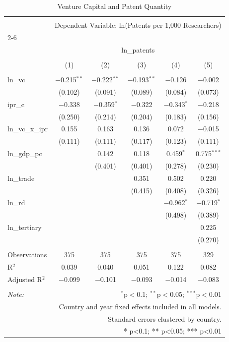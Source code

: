 
\begin{table}[!htbp] \centering 
  \caption{Venture Capital and Patent Quantity} 
  \label{} 
\begin{tabular}{@{\extracolsep{5pt}}lccccc} 
\\[-1.8ex]\hline 
\hline \\[-1.8ex] 
 & \multicolumn{5}{c}{Dependent Variable: ln(Patents per 1,000 Researchers)} \\ 
\cline{2-6} 
\\[-1.8ex] & \multicolumn{5}{c}{ln\_patents} \\ 
\\[-1.8ex] & (1) & (2) & (3) & (4) & (5)\\ 
\hline \\[-1.8ex] 
 ln\_vc & $-$0.215$^{**}$ & $-$0.222$^{**}$ & $-$0.193$^{**}$ & $-$0.126 & $-$0.002 \\ 
  & (0.102) & (0.091) & (0.089) & (0.084) & (0.073) \\ 
  ipr\_c & $-$0.338 & $-$0.359$^{*}$ & $-$0.322 & $-$0.343$^{*}$ & $-$0.218 \\ 
  & (0.250) & (0.214) & (0.204) & (0.183) & (0.156) \\ 
  ln\_vc\_x\_ipr & 0.155 & 0.163 & 0.136 & 0.072 & $-$0.015 \\ 
  & (0.111) & (0.111) & (0.117) & (0.123) & (0.111) \\ 
  ln\_gdp\_pc &  & 0.142 & 0.118 & 0.459$^{*}$ & 0.775$^{***}$ \\ 
  &  & (0.401) & (0.401) & (0.278) & (0.230) \\ 
  ln\_trade &  &  & 0.351 & 0.502 & 0.220 \\ 
  &  &  & (0.415) & (0.408) & (0.326) \\ 
  ln\_rd &  &  &  & $-$0.962$^{*}$ & $-$0.719$^{*}$ \\ 
  &  &  &  & (0.498) & (0.389) \\ 
  ln\_tertiary &  &  &  &  & 0.225 \\ 
  &  &  &  &  & (0.270) \\ 
 \hline \\[-1.8ex] 
Observations & 375 & 375 & 375 & 375 & 329 \\ 
R$^{2}$ & 0.039 & 0.040 & 0.051 & 0.122 & 0.082 \\ 
Adjusted R$^{2}$ & $-$0.099 & $-$0.101 & $-$0.093 & $-$0.014 & $-$0.083 \\ 
\hline 
\hline \\[-1.8ex] 
\textit{Note:}  & \multicolumn{5}{r}{$^{*}$p$<$0.1; $^{**}$p$<$0.05; $^{***}$p$<$0.01} \\ 
 & \multicolumn{5}{r}{Country and year fixed effects included in all models.} \\ 
 & \multicolumn{5}{r}{Standard errors clustered by country.} \\ 
 & \multicolumn{5}{r}{* p<0.1; ** p<0.05; *** p<0.01} \\ 
\end{tabular} 
\end{table} 
